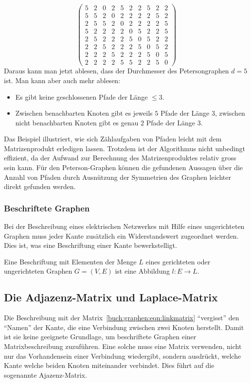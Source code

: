 \begin{beispiel}
\[\begin{pmatrix}
 5& 2& 0& 2& 5& 2& 2& 5& 2& 2\\
 5& 5& 2& 0& 2& 2& 2& 2& 5& 2\\
 2& 5& 5& 2& 0& 2& 2& 2& 2& 5\\
 5& 2& 2& 2& 2& 0& 5& 2& 2& 5\\
 2& 5& 2& 2& 2& 5& 0& 5& 2& 2\\
 2& 2& 5& 2& 2& 2& 5& 0& 5& 2\\
 2& 2& 2& 5& 2& 2& 2& 5& 0& 5\\
 2& 2& 2& 2& 5& 5& 2& 2& 5& 0
\end{pmatrix}
\]
Daraus kann man jetzt ablesen, dass der Durchmesser des Petersongraphen
$d=5$ ist.
Man kann aber auch mehr ablesen:
\begin{itemize}
\item
Es gibt keine geschlossenen Pfade der Länge $\le 3$.
\item
Zwischen benachbarten Knoten gibt es jeweils $5$ Pfade der Länge $3$,
zwischen nicht benachbarten Knoten gibt es genau $2$ Pfade der Länge $3$.
\qedhere
\end{itemize}
\end{beispiel}

Das Beispiel illustriert, wie sich Zählaufgaben von Pfaden leicht mit dem
Matrizenprodukt erledigen lassen.
Trotzdem ist der Algorithmus nicht unbedingt effizient, da der Aufwand
zur Berechnung des Matrizenproduktes relativ gross sein kann.
Für den Peterson-Graphen können die gefundenen Aussagen über die Anzahl
von Pfaden durch Ausnützung der Symmetrien des Graphen leichter direkt
gefunden werden.

\subsubsection{Beschriftete Graphen}
Bei der Beschreibung eines elektrischen Netzwerkes mit Hilfe eines
ungerichteten Graphen muss jeder Kante zusätzlich ein Widerstandswert
zugeordnet werden.
Dies ist, was eine Beschriftung einer Kante bewerkstelligt.

\begin{definition}
Eine Beschriftung mit Elementen der Menge $L$
eines gerichteten oder ungerichteten Graphen $G=(V,E)$ 
ist eine Abbildung $l\colon E\to L$.
\end{definition}

\subsection{Die Adjazenz-Matrix und Laplace-Matrix
\label{subsection:adjazenz-und-laplace-matrix}}
Die Beschreibung mit der Matrix~\eqref{buch:graphen:eqn:linkmatrix}
``vergisst'' den ``Namen'' der Kante, die eine Verbindung zwischen zwei
Knoten herstellt.
Damit ist sie keine geeignete Grundlage, um beschriftete Graphen einer
Matrixbeschreibung zuzuführen.
Eine solche muss eine Matrix verwenden, nicht nur das Vorhandensein einer
Verbindung wiedergibt, sondern ausdrückt, welche Kante welche beiden
Knoten miteinander verbindet.
Dies führt auf die sogenannte Ajazenz-Matrix.

